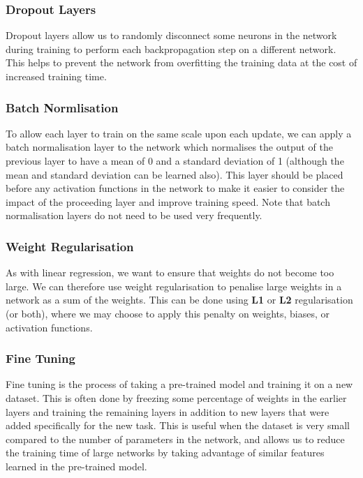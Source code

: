 \documentclass{article}
\begin{document}
\subsubsection{Dropout Layers}
Dropout layers allow us to randomly disconnect some neurons in the
network during training to perform each backpropagation step on a
different network. This helps to prevent the network from overfitting
the training data at the cost of increased training time.
\subsubsection{Batch Normlisation}
To allow each layer to train on the same scale upon each update, we can
apply a batch normalisation layer to the network which normalises the
output of the previous layer to have a mean of 0 and a standard
deviation of 1 (although the mean and standard deviation can be learned
also). This layer should be placed before any activation functions in
the network to make it easier to consider the impact of the proceeding
layer and improve training speed. Note that batch normalisation layers
do not need to be used very frequently.
\subsubsection{Weight Regularisation}
As with linear regression, we want to ensure that weights do not become
too large. We can therefore use weight regularisation to penalise large
weights in a network as a sum of the weights. This can be done using
\textbf{L1} or \textbf{L2} regularisation (or both), where we may
choose to apply this penalty on weights, biases, or activation
functions.
\subsubsection{Fine Tuning}
Fine tuning is the process of taking a pre-trained model and training
it on a new dataset. This is often done by freezing some percentage of
weights in the earlier layers and training the remaining layers in
addition to new layers that were added specifically for the new task.
This is useful when the dataset is very small compared to the number of
parameters in the network, and allows us to reduce the training time of
large networks by taking advantage of similar features learned in the
pre-trained model.
\end{document}
